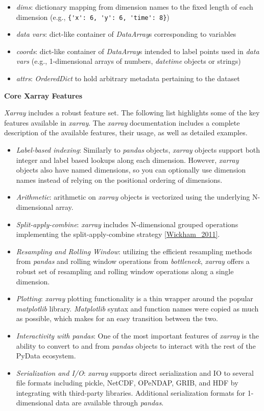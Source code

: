\documentclass{jors}
\begin{document}
\begin{itemize}
	\item \textit{dims}: dictionary mapping from dimension names to the fixed length of each dimension (e.g., \verb|{'x': 6, 'y': 6, 'time': 8}|)
	\item \textit{data vars}: dict-like container of \textit{DataArray}s corresponding to variables
	\item \textit{coords}: dict-like container of \textit{DataArray}s intended to label points used in \textit{data vars} (e.g., 1-dimensional arrays of numbers, \textit{datetime} objects or strings)
	\item \textit{attrs}: \textit{OrderedDict} to hold arbitrary metadata pertaining to the dataset
\end{itemize}

\textbf{Core Xarray Features}

\textit{Xarray} includes a robust feature set.
The following list highlights some of the key features available in \textit{xarray}.
The \textit{xarray} documentation \citep{xarray_docs} includes a complete description of the available features, their usage, as well as detailed examples.

\begin{itemize}
	\item \textit{Label-based indexing}: Similarly to \textit{pandas} objects, \textit{xarray} objects support both integer and label based lookups along each dimension.
	However, \textit{xarray} objects also have named dimensions, so you can optionally use dimension names instead of relying on the positional ordering of dimensions.
	\item \textit{Arithmetic}: arithmetic on \textit{xarray} objects is vectorized using the underlying N-dimensional array.
	\item \textit{Split-apply-combine}: \textit{xarray} includes N-dimensional grouped operations implementing the split-apply-combine strategy \ref{Wickham_2011}.
	\item \textit{Resampling and Rolling Window}: utilizing the efficient resampling methods from \textit{pandas} and rolling window operations from \textit{bottleneck}, \textit{xarray} offers a robust set of resampling and rolling window operations along a single dimension.
	\item \textit{Plotting}: \textit{xarray} plotting functionality is a thin wrapper around the popular \textit{matplotlib} library. \textit{Matplotlib} syntax and function names were copied as much as possible, which makes for an easy transition between the two.
	\item \textit{Interactivity with pandas}: One of the most important features of \textit{xarray} is the ability to convert to and from \textit{pandas} objects to interact with the rest of the PyData ecosystem.
	\item \textit{Serialization and I/O}: \textit{xarray} supports direct serialization and IO to several file formats including pickle, NetCDF, OPeNDAP, GRIB, and HDF by integrating with third-party libraries. Additional serialization formats for 1-dimensional data are available through \textit{pandas}.
\end{itemize}
\end{document}
